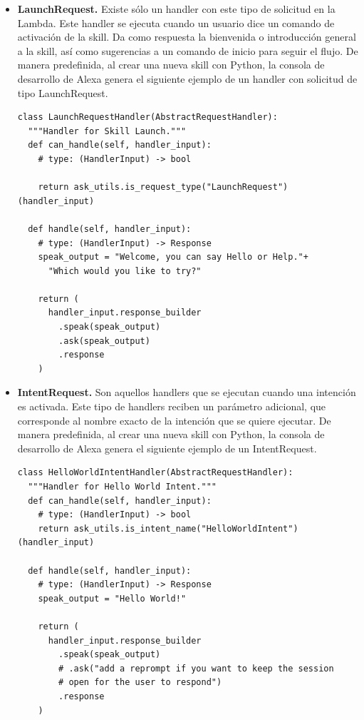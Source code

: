 \begin{itemize}
  \item \textbf{LaunchRequest.} Existe sólo un handler con este tipo de solicitud en la Lambda. Este handler se ejecuta cuando un usuario dice un comando de activación de la skill. Da como respuesta la bienvenida o introducción general a la skill, así como sugerencias a un comando de inicio para seguir el flujo. De manera predefinida, al crear una nueva skill con Python, la consola de desarrollo de Alexa genera el siguiente ejemplo de un handler con solicitud de tipo LaunchRequest.
  \begin{tcolorbox}[colback=white!25!white,colframe=blue]
    \begin{verbatim}
class LaunchRequestHandler(AbstractRequestHandler):
  """Handler for Skill Launch."""
  def can_handle(self, handler_input):
    # type: (HandlerInput) -> bool
  
    return ask_utils.is_request_type("LaunchRequest")(handler_input)
  
  def handle(self, handler_input):
    # type: (HandlerInput) -> Response
    speak_output = "Welcome, you can say Hello or Help."+
      "Which would you like to try?"
  
    return (
      handler_input.response_builder
        .speak(speak_output)
        .ask(speak_output)
        .response
    )
    \end{verbatim}
  \end{tcolorbox}
  \item \textbf{IntentRequest.} Son aquellos handlers que se ejecutan cuando una intención es activada. Este tipo de handlers reciben un parámetro adicional, que corresponde al nombre exacto de la intención que se quiere ejecutar. De manera predefinida, al crear una nueva skill con Python, la consola de desarrollo de Alexa genera el siguiente ejemplo de un IntentRequest.
  \begin{tcolorbox}[colback=white!25!white,colframe=blue]
    \begin{verbatim}
class HelloWorldIntentHandler(AbstractRequestHandler):
  """Handler for Hello World Intent."""
  def can_handle(self, handler_input):
    # type: (HandlerInput) -> bool
    return ask_utils.is_intent_name("HelloWorldIntent")(handler_input)

  def handle(self, handler_input):
    # type: (HandlerInput) -> Response
    speak_output = "Hello World!"

    return (
      handler_input.response_builder
        .speak(speak_output)
        # .ask("add a reprompt if you want to keep the session
        # open for the user to respond")
        .response
    )
    \end{verbatim}
  \end{tcolorbox}
\end{itemize}

